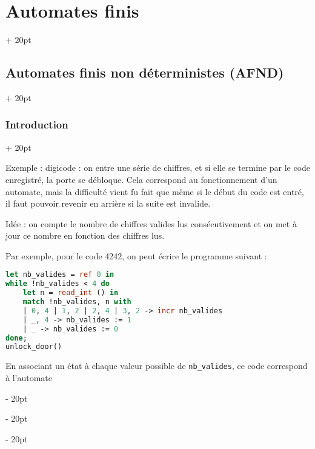 \documentclass[a4paper, 12pt, twoside]{article}
\newcommand{\ind}[1][20pt]{\advance\leftskip + #1}
\newcommand{\deind}[1][20pt]{\advance\leftskip - #1}
\newenvironment{indt}[2][20pt]{#2 \par \ind[#1]}{\par \deind} %
\begin{document}
\begin{indt}{\section{Automates finis}}
\begin{indt}{\subsection{Automates finis non déterministes (AFND)}}
\begin{indt}{\subsubsection{Introduction}}
                \vspace{12pt}
                
                Exemple : digicode : on entre une série de chiffres, et si elle se termine par le code enregistré, la porte se débloque.
                Cela correspond au fonctionnement d'un automate, mais la difficulté vient fu fait que même si le début du code est entré, il faut pouvoir revenir en arrière si la suite est invalide.

                Idée : on compte le nombre de chiffres valides lus consécutivement et on met à jour ce nombre en fonction des chiffres lus.

                Par exemple, pour le code 4242, on peut écrire le programme suivant :

                \begin{lstlisting}[language=Caml, xleftmargin=80pt]
let nb_valides = ref 0 in
while !nb_valides < 4 do
    let n = read_int () in
    match !nb_valides, n with
    | 0, 4 | 1, 2 | 2, 4 | 3, 2 -> incr nb_valides
    | _, 4 -> nb_valides := 1
    | _ -> nb_valides := 0
done;
unlock_door()\end{lstlisting}
                
                En associant un état à chaque valeur possible de \texttt{nb\_valides}, ce code correspond à l'automate

                \begin{center}
                \end{center}


\end{indt}
\end{indt}
\end{indt}
\end{document}
